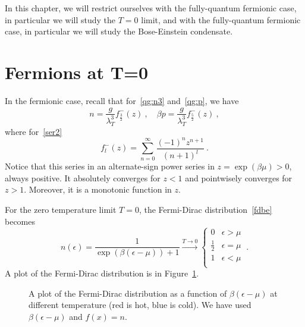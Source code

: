     In this chapter, we will restrict ourselves with the fully-quantum fermionic case, in particular we will study the $T = 0$ limit, and with the fully-quantum fermionic case, in particular we will study the Bose-Einstein condensate.

\section{Fermions at T=0}

    In the fermionic case, recall that for~\eqref{qg:n3} and~\eqref{qg:p}, we have
    \begin{equation*}
        n = \frac{g}{\lambda_T^3} f_{\frac{3}{2}}^- (z) ~, \quad \beta p = \frac{g}{\lambda_T^3} f_{\frac{5}{2}}^- (z) ~,
    \end{equation*}
    where for~\eqref{ser2}
    \begin{equation*}
        f_l^- (z) = \sum_{n=0}^\infty \frac{(-1)^n z^{n+1}}{(n+1)^l} ~.
    \end{equation*}
    Notice that this series in an alternate-sign power series in $z = \exp(\beta\mu) > 0$, always positive. It absolutely converges for $z < 1$ and pointwisely converges for $z > 1$. Moreover, it is a monotonic function in $z$. 

    For the zero temperature limit $T = 0$, the Fermi-Dirac distribution~\eqref{fdbe} becomes 
    \begin{equation}\label{fdtz}
        n(\epsilon) = \frac{1}{\exp(\beta(\epsilon - \mu)) + 1} \xrightarrow{T \rightarrow 0} \begin{cases}
            0 & \epsilon > \mu \\
            \frac{1}{2} & \epsilon = \mu \\
            1 & \epsilon < \mu \\
        \end{cases} ~.
    \end{equation} 
    A plot of the Fermi-Dirac distribution is in Figure~\ref{fig:fd}.
    \begin{figure}
        \centering
        \caption{A plot of the Fermi-Dirac distribution as a function of $\beta (\epsilon - \mu)$ at different temperature (red is hot, blue is cold). We have used $\beta (\epsilon - \mu)$ and $f(x) = n$.}
        \label{fig:fd}
    \end{figure}
    
